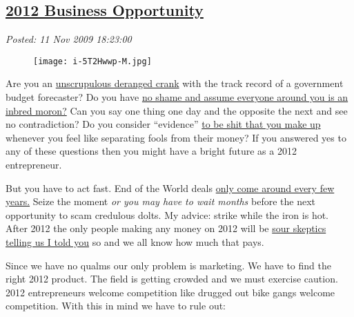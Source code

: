 %

\subsection*{\href{http://bakerjd99.wordpress.com/2009/11/11/2012-business-opportunity/}{2012 Business Opportunity}}


\noindent\emph{Posted: 11 Nov 2009 18:23:00}
\vspace{6pt}



\begin{figure}[htbp]
\centering
\texttt{[image: i-5T2Hwwp-M.jpg]}
\label{fig:295X0}
\end{figure}


Are
you an
\href{http://en.wikipedia.org/wiki/Richard\_C.\_Hoagland}{unscrupulous
deranged crank} with the track record of a government budget forecaster?
Do you have \href{http://www.bennyhinn.org/default.cfm}{no shame and
assume everyone around you is an inbred moron?} Can you say one thing
one day and the opposite the next and see no contradiction? Do you
consider ``evidence''
\href{http://blogcritics.org/scitech/article/is-science-just-another-opinion/}{to
be shit that you make up} whenever you feel like separating fools from
their money? If you answered yes to any of these questions then you
might have a bright future as a 2012 entrepreneur.

But you have to act fast. End of the World deals
\href{http://www.bible.ca/pre-date-setters.htm}{only come around every
few years.} Seize the moment \emph{or you may have to wait months}
before the next opportunity to scam credulous dolts. My advice: strike
while the iron is hot. After 2012 the only people making any money on
2012 will be
\href{http://www.skyandtelescope.com/news/64430612.html}{sour skeptics
telling us I told you} so and we all know how much that pays.

Since we have no qualms our only problem is marketing. We have to find
the right 2012 product. The field is getting crowded and we must
exercise caution. 2012 entrepreneurs welcome competition like drugged
out bike gangs welcome competition. With this in mind we have to rule
out:

